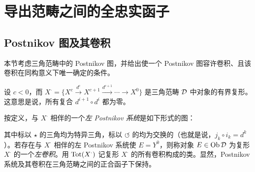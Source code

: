 \chapter{导出范畴之间的全忠实函子}

\section{Postnikov 图及其卷积}



本节考虑三角范畴中的 Postnikov 图，并给出使一个 Postnikov 图容许卷积、且该卷积在同构意义下唯一确定的条件。

设 $c<0$，而 $X^{\cdot}=\{X^{c}\xrightarrow{d^{c}}X^{c+1}\xrightarrow{d^{c+1}}\cdots\to X^{0}\}$ 是三角范畴 $\mathcal{D}$ 中对象的有界复形。这意思是说，所有复合 $d^{i+1}\circ d^{i}$ 都为零。

按定义，与 $X^{\cdot}$ 相伴的一个\emph{左 Postnikov 系统}是如下形式的图：
\begin{center}
\end{center}
其中标以 $\star$ 的三角均为特异三角，标以 $\circlearrowleft$ 的均为交换的（也就是说，$j_{k}\circ i_{k}=d^{k}$）。若存在与 $X^{\cdot}$ 相伴的左 Postnikov 系统使 $E=Y^{0}$，则称对象 $E\in\operatorname{Ob}\mathcal{D}$ 为复形 $X^{\cdot}$ 的一个\emph{左卷积}。用 $\operatorname{Tot}(X^{\cdot})$ 记复形 $X^{\cdot}$ 的所有卷积构成的类。显然，Postnikov 系统及其卷积在三角范畴之间的正合函子下保持。

